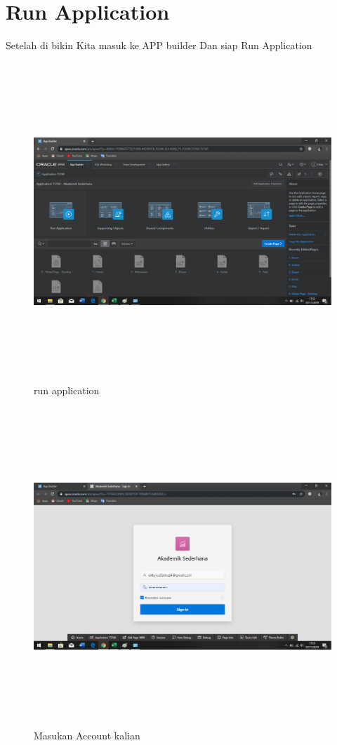 \documentclass[a4, 13pt]{article}
\begin{document}
    \section{Run Application}
    Setelah di bikin Kita masuk ke APP builder Dan siap Run Application
     \begin{figure}[!htbp]
        \centering
        \includegraphics[width=16cm, height=12cm]{pictures/M.png}
        \caption{run application}
        \label{fig:my_label}
    \end{figure}
      \begin{figure}[!htbp]
        \centering
        \includegraphics[width=16cm, height=12cm]{pictures/N.png}
        \caption{Masukan Account kalian}
        \label{fig:my_label}
    \end{figure}
    \vspace{3cm}
\end{document}
